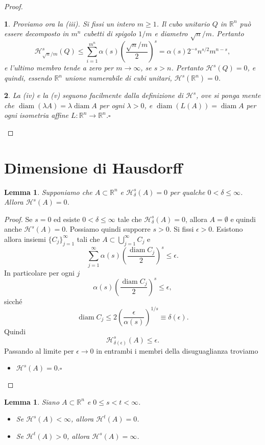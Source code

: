 \documentclass[a4paper,10pt,openright,oneside]{book}
\theoremstyle{theoremstyle}
\newtheorem{lemma}[teorema]{Lemma}
\theoremstyle{theoremstylewoheader}
\theoremstyle{theoremstyle}
\theoremstyle{proofsecstyle}
\newtheorem{proofsec}{}
\theoremstyle{nonumberplain}
\newtheorem{proof}{Dim.}
\newcommand{\RR}{\ensuremath{\mathbb{R}}}
\newcommand{\Haus}{\ensuremath{\mathcal{H}}}
\DeclareMathOperator{\diam}{diam}
\renewcommand{\qedsymbol}{\ensuremath{\square}}
\newcommand{\qed}{\unskip\nobreak\hfill\nobreak\hspace{.5em}\qedsymbol}
\newcommand{\mymath}[2]{\begin{itemize}%
  \item[]\hfill\hbox{}\ensuremath{\displaystyle #1}\hfill\ensuremath{\displaystyle #2}%
  \end{itemize}}
\begin{document}
\begin{proof}
\begin{proofsec}
Proviamo ora la (iii). Si fissi un intero $m \ge 1$. Il cubo unitario $Q$ in $\RR^n$ può essere decomposto in $m^n$ cubetti di spigolo $1/m$ e diametro $\sqrt{n}/m$. Pertanto
\[
\Haus_{\sqrt{n}/m}^s (Q) \le \sum_{i=1}^{m^n} \alpha(s)\left(\frac{\sqrt{n}/m}{2}\right)^s = \alpha(s) 2^{-s} n^{s/2} m^{n-s},
\]
e l'ultimo membro tende a zero per $m \to \infty$, se $s > n$. Pertanto $\Haus^s(Q) = 0$, e quindi, essendo $\RR^n$ unione numerabile di cubi unitari, $\Haus^s(\RR^n) = 0$.
\end{proofsec}

\begin{proofsec}
La (iv) e la (v) seguono facilmente dalla definizione di $\Haus^s$, ove si ponga mente che $\diam (\lambda A) = \lambda \diam A$ per ogni $\lambda > 0$, e $\diam (L(A)) = \diam A$ per ogni isometria affine $L : \RR^n \rightarrow \RR^n$.\qed
\end{proofsec}
\end{proof}

\section{Dimensione di Hausdorff}

\begin{lemma}
Supponiamo che $A \subset \RR^n$ e $\Haus_\delta^s (A) = 0$ per qualche $0 < \delta \le \infty$. Allora $\Haus^s (A) = 0$.
\end{lemma}

\begin{proof}
Se $s = 0$ ed esiste $0 < \delta \le \infty$ tale che $\Haus_\delta^s(A) = 0$, allora $A = \emptyset$ e quindi anche $\Haus^s(A) = 0$. Possiamo quindi supporre $s > 0$. Si fissi $\epsilon > 0$. Esistono allora insiemi $\{C_j\}_{j=1}^\infty$ tali che $A \subset \bigcup_{j=1}^\infty C_j$ e
\[
\sum_{j=1}^\infty \alpha(s)\left(\frac{\diam C_j}{2}\right)^s \le \epsilon.
\]
In particolare per ogni $j$
\[
\alpha(s)\left(\frac{\diam C_j}{2}\right)^s \le \epsilon,
\]
sicché
\[
\diam C_j \le 2\left(\frac{\epsilon}{\alpha(s)}\right)^{1/s} \equiv \delta(\epsilon).
\]
Quindi
\[
\Haus_{\delta(\epsilon)}^s (A) \le \epsilon.
\]
Passando al limite per $\epsilon \to 0$ in entrambi i membri della disuguaglianza troviamo
\mymath{\Haus^s (A) = 0.}{\qedsymbol}
\end{proof}

\begin{lemma}
\label{lem:pre_proprieta_dimensione_hausdorff}
Siano $A \subset \RR^n$ e $0 \le s < t < \infty$.
\begin{itemize}
\item[(i)] Se $\Haus^s(A) < \infty$, allora $\Haus^t(A) = 0$.
\item[(ii)] Se $\Haus^t(A) > 0$, allora $\Haus^s(A) = \infty$.
\end{itemize}
\end{lemma}
\end{document}
